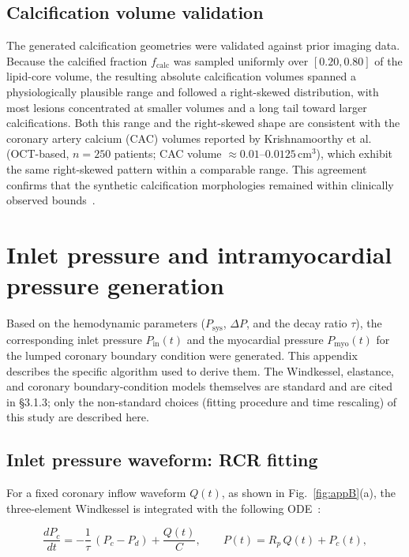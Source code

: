 \documentclass[master,english,final]{kaist-ucs}
\begin{document}
\section{Calcification volume validation}

The generated calcification geometries were validated against prior imaging data. Because the calcified fraction $f_\mathrm{calc}$ was sampled uniformly over $[0.20, 0.80]$ of the lipid-core volume, the resulting absolute calcification volumes spanned a physiologically plausible range and followed a right-skewed distribution, with most lesions concentrated at smaller volumes and a long tail toward larger calcifications. Both this range and the right-skewed shape are consistent with the coronary artery calcium (CAC) volumes reported by Krishnamoorthy et al. (OCT-based, $n=250$ patients; CAC volume $\approx 0.01$--$0.0125\,\mathrm{cm}^3$), which exhibit the same right-skewed pattern within a comparable range. This agreement confirms that the synthetic calcification morphologies remained within clinically observed bounds~\cite{krishnamoorthy2017}.


\chapter{Inlet pressure and intramyocardial pressure generation}

Based on the hemodynamic parameters ($P_\mathrm{sys}$, $\Delta P$, and the decay ratio $\tau$), the corresponding inlet pressure $P_\mathrm{in}(t)$ and the myocardial pressure $P_\mathrm{myo}(t)$ for the lumped coronary boundary condition were generated. This appendix describes the specific algorithm used to derive them. The Windkessel, elastance, and coronary boundary-condition models themselves are standard and are cited in \S3.1.3; only the non-standard choices (fitting procedure and time rescaling) of this study are described here.

\section{Inlet pressure waveform: RCR fitting}
For a fixed coronary inflow waveform $Q(t)$, as shown in Fig.~\ref{fig:appB}(a), the three-element Windkessel is integrated with the following ODE~\cite{westerhof2009windkessel}:

\begin{equation}
\frac{dP_c}{dt} = -\frac{1}{\tau}\,(P_c - P_d) + \frac{Q(t)}{C}, \qquad P(t) = R_p\,Q(t) + P_c(t),
\end{equation}
\end{document}
